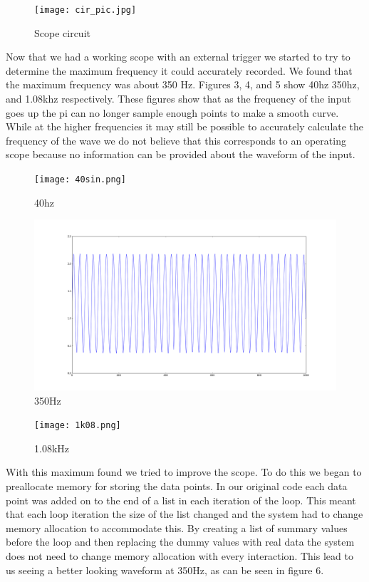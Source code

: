 \documentclass[prl,12pt,notitlepage,aps,onecolumn,superscriptaddress]{revtex4-1}
\begin{document}
\begin{figure}[h]
\begin{center}
\texttt{[image: cir\_pic.jpg]}
\end{center}
\caption{\label{fig:pic} Scope circuit}
\end{figure}

Now that we had a working scope with an external trigger we started to try to determine the maximum frequency it could accurately recorded. We found that the maximum frequency was about 350 Hz. Figures 3, 4, and 5 show 40hz 350hz, and 1.08khz respectively. These figures show that as the frequency of the input goes up the pi can no longer sample enough points to make a smooth curve. While at the higher frequencies it may still be possible to accurately calculate the frequency of the wave we do not believe that this corresponds to an operating scope because no information can be provided about the waveform of the input.

\begin{figure}[h]
\begin{center}
\texttt{[image: 40sin.png]}
\end{center}
\caption{\label{fig:pic} 40hz}
\end{figure}

\begin{figure}[h]
\begin{center}
\includegraphics[width=.5\columnwidth]{350_max_freq.png}
\end{center}
\caption{\label{fig:pic} 350Hz}
\end{figure}

\begin{figure}[h]
\begin{center}
\texttt{[image: 1k08.png]}
\end{center}
\caption{\label{fig:pic} 1.08kHz}
\end{figure}

With this maximum found we tried to improve the scope. To do this we began to preallocate memory for storing the data points. In our original code each data point was added on to the end of a list in each iteration of the loop. This meant that each loop iteration the size of the list changed and the system had to change memory allocation to accommodate this. By creating a list of summary values before the loop and then replacing the dummy values with real data the system does not need to change memory allocation with every interaction. This lead to us seeing a better looking waveform at 350Hz, as can be seen in figure 6.
\end{document}
